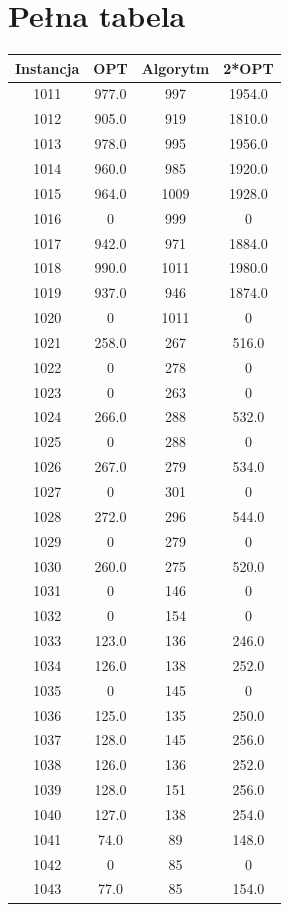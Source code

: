 \documentclass[12pt, a4paper]{report}
\begin{document}
\chapter{Pełna tabela}
\begin{longtable}{| c | c | c | c |}
  \hline
  Instancja & OPT & Algorytm & 2*OPT\\
  \hline
  1011 & 977.0 & 997 & 1954.0 \\
  1012 & 905.0 & 919 & 1810.0 \\
  1013 & 978.0 & 995 & 1956.0 \\
  1014 & 960.0 & 985 & 1920.0 \\
  1015 & 964.0 & 1009 & 1928.0 \\
  1016 & 0 & 999 & 0 \\
  1017 & 942.0 & 971 & 1884.0 \\
  1018 & 990.0 & 1011 & 1980.0 \\
  1019 & 937.0 & 946 & 1874.0 \\
  1020 & 0 & 1011 & 0 \\
  1021 & 258.0 & 267 & 516.0 \\
  1022 & 0 & 278 & 0 \\
  1023 & 0 & 263 & 0 \\
  1024 & 266.0 & 288 & 532.0 \\
  1025 & 0 & 288 & 0 \\
  1026 & 267.0 & 279 & 534.0 \\
  1027 & 0 & 301 & 0 \\
  1028 & 272.0 & 296 & 544.0 \\
  1029 & 0 & 279 & 0 \\
  1030 & 260.0 & 275 & 520.0 \\
  1031 & 0 & 146 & 0 \\
  1032 & 0 & 154 & 0 \\
  1033 & 123.0 & 136 & 246.0 \\
  1034 & 126.0 & 138 & 252.0 \\
  1035 & 0 & 145 & 0 \\
  1036 & 125.0 & 135 & 250.0 \\
  1037 & 128.0 & 145 & 256.0 \\
  1038 & 126.0 & 136 & 252.0 \\
  1039 & 128.0 & 151 & 256.0 \\
  1040 & 127.0 & 138 & 254.0 \\
  1041 & 74.0 & 89 & 148.0 \\
  1042 & 0 & 85 & 0 \\
  1043 & 77.0 & 85 & 154.0 \\

\end{longtable}
\end{document}
